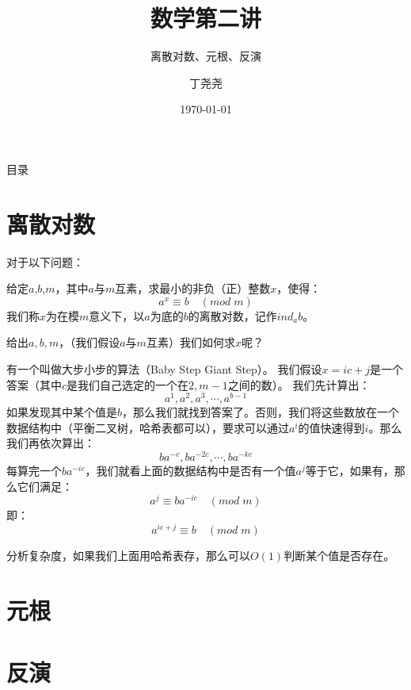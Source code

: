 \documentclass{beamer}
\title{数学第二讲}
\subtitle{离散对数、元根、反演}
\author{丁尧尧}
\institute{上海交通大学}
\date{\today}
\begin{document}
	\maketitle
	\begin{frame}{目录}
		\tableofcontents
	\end{frame}
	
	\section{离散对数}
		\begin{frame}
			对于以下问题：
			\begin{definition}[离散对数]
				给定$a$,$b$,$m$，其中$a$与$m$互素，求最小的非负（正）整数$x$，使得：
				$$
				a^x \equiv b \quad (mod \; m)
				$$
				我们称$x$为在模$m$意义下，以$a$为底的$b$的离散对数，记作$ind_ab$。
			\end{definition}
			给出$a,b,m$，（我们假设$a$与$m$互素）我们如何求$x$呢？
		\end{frame}
		\begin{frame}
			有一个叫做大步小步的算法（Baby Step Giant Step）。
			我们假设$x = ic + j$是一个答案（其中$c$是我们自己选定的一个在$2,m-1$之间的数）。
			我们先计算出：
			$$
			a^1, a^2, a^3, \cdots, a^{b-1}
			$$			
			如果发现其中某个值是$b$，那么我们就找到答案了。否则，我们将这些数放在一个数据结构中（平衡二叉树，哈希表都可以），要求可以通过$a^i$的值快速得到$i$。那么我们再依次算出：
			$$
			ba^{-c}, ba^{-2c}, \cdots, ba^{-kc}
			$$
			每算完一个$ba^{-ic}$，我们就看上面的数据结构中是否有一个值$a^j$等于它，如果有，那么它们满足：
			$$
			a^j \equiv ba^{-ic} \quad (mod \; m)
			$$
			即：
			$$
			a^{ic + j} \equiv b \quad (mod \; m)
			$$
		\end{frame}
		\begin{frame}
			分析复杂度，如果我们上面用哈希表存，那么可以$O(1)$判断某个值是否存在。
			
			
		\end{frame}
	\section{元根}
	\section{反演}
\end{document}
